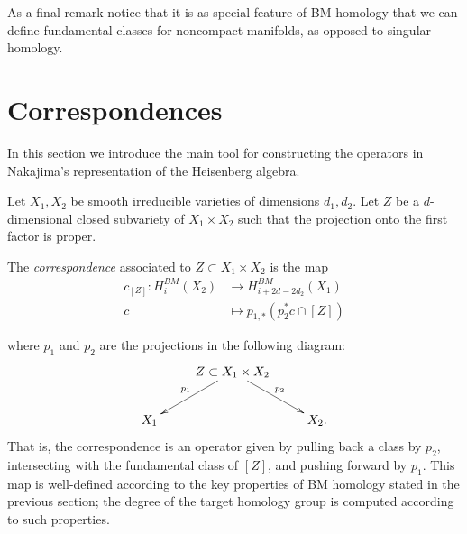 \noindent
As a final remark notice that it is
as special feature of BM homology
that we can define fundamental classes for
noncompact manifolds, as opposed to 
singular homology.

\section{Correspondences}
\label{section-correspondences}

\noindent
In this section we introduce the main tool
for constructing the operators in Nakajima's representation
of the Heisenberg algebra.

\medskip\noindent
Let $X_1,X_2$ be smooth irreducible varieties
of dimensions $d_1,d_2$.
Let $Z$ be a $d$-dimensional 
closed subvariety of $X_1\times X_2$ 
such that the projection onto the first factor
is proper.

The {\it correspondence} associated to $Z \subset X_1\times X_2$
is the map
\begin{equation}
\label{equation-correspondence}
\begin{aligned}
c_{[Z]}:H_i^{BM}(X_2)&\longrightarrow H_{i+2d-2d_2}^{BM}(X_1)\\
c&\longmapsto p_{1,*}(p_2^*c\cap [Z])
\end{aligned}
\end{equation}

\noindent
where $p_1$ and $p_2$ are the projections in the following diagram:
$$
\xymatrix{
&Z\ar[ld]_{p_1}\ar[rd]^{p_2} \subset X_1\times X_2\\
X_1&&X_2.
}
$$
\noindent
That is, the correspondence is an operator
given by pulling back a class by $p_2$,
intersecting with the fundamental class of $[Z]$,
and pushing forward by $p_1$.
This map is well-defined according
to the key properties of BM homology stated in the previous section;
the degree of the target homology group is computed according
to such properties.

